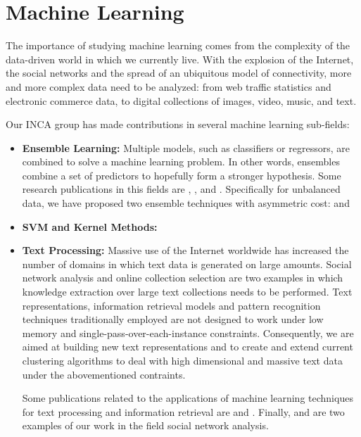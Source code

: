 \section{Machine Learning}

The importance of studying machine learning comes from the complexity of the
data-driven world in which we currently live. With the explosion of the
Internet, the social networks and the spread of an ubiquitous model of
connectivity, more and more complex data need to be analyzed: from web traffic
statistics and electronic commerce data, to digital collections of images,
video, music, and text.

Our INCA group has made contributions in several machine learning sub-fields:
\begin{itemize}
\item \textbf{Ensemble Learning:} Multiple models, such as classifiers or regressors, are combined to solve a machine learning problem. In other words, ensembles combine a set of predictors to hopefully form a stronger hypothesis. Some research publications in this fields are \cite{NanculefVAM06}, \cite{ValleSAMF10}, \cite{FernandezVSA12} and \cite{NanculefVAM12}. Specifically for unbalanced data, we have proposed two ensemble techniques with asymmetric cost: \cite{NanculefVAM07} and \cite{OrmenoRVAA12}
\item \textbf{SVM and Kernel Methods:}
\item \textbf{Text Processing:} Massive use of the Internet worldwide has
increased the number of domains in which text data is generated on large
amounts. Social network analysis and online collection selection are two
examples in which knowledge extraction over large text collections needs to be
performed. Text representations, information retrieval models and pattern
recognition techniques traditionally employed are not designed to work under low
memory and single-pass-over-each-instance constraints. Consequently, we are
aimed at building new text representations and to create and extend current
clustering algorithms to deal with high dimensional and massive text data under
the abovementioned contraints.

Some publications related to the applications of machine learning techniques
for text processing and information retrieval are \cite{ZMA14} and
\cite{MZ09}. Finally, \cite{ZGDAVS13} and \cite{CSHZ12} are two examples of
our work in the field social network analysis.


\end{itemize}
